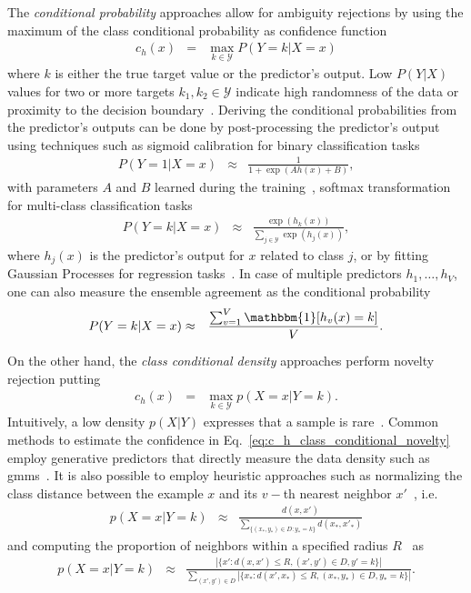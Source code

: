 The \emph{conditional probability} approaches allow for ambiguity rejections by using the maximum of the class conditional probability as confidence function~\citep{Pazzani1994,Fumera2004a,Lam1995}
\begin{eqnarray}\label{eq:c_h_class_conditional_ambiguity}
    c_h(x) &=& \max_{k\in \mathcal{Y}} P(Y=k|X=x)
\end{eqnarray}
where $k$ is either the true target value or the predictor's output. Low $P(Y|X)$ values for two or more targets $k_1, k_2 \in \mathcal{Y}$ indicate high randomness of the data or proximity to the decision boundary~\citep{Arlandis2002}. Deriving the conditional probabilities from the predictor's outputs can be done by post-processing the predictor's output using techniques such as sigmoid calibration for binary classification tasks~\citep{Cordella2014,Brinkrolf2017}
\begin{eqnarray*}
    P(Y = 1|X=x) &\approx& \frac{1}{1+\exp(A h(x) + B)},
\end{eqnarray*}
with parameters $A$ and $B$ learned during the training~\citep{Brinkrolf2018}, softmax transformation for multi-class classification tasks~\citep{Kwok1999}
\begin{eqnarray*}
    P(Y = k|X=x) &\approx& \frac{\exp{(h_k(x))}}{\sum_{j \in \mathcal{Y}} \exp{(h_j(x))}},
\end{eqnarray*}
where $h_j(x)$ is the predictor's output for $x$ related to class $j$, or by fitting Gaussian Processes for regression tasks~\citep{SambuSeo2000}. In case of multiple predictors $h_1, \dots, h_V$, one can also measure the ensemble agreement as the conditional probability~\citep{Glodek2012,Zhang2013}
\begin{eqnarray*}
    P(Y = k|X=x) &\approx& \frac{\sum_{v=1}^V \mathbbm{1} [h_v(x) = k]}{V}.
\end{eqnarray*}


On the other hand, the \emph{class conditional density} approaches perform novelty rejection putting~\citep{Dubuisson1993,Dubuisson1985}
\begin{eqnarray}\label{eq:c_h_class_conditional_novelty}
    c_h(x) &=& \max_{k \in \mathcal{Y}} p(X=x|Y=k).
\end{eqnarray}
Intuitively, a low density $p(X|Y)$ expresses that a sample is rare~\citep{Condessa2015b}. Common methods to estimate the confidence in Eq.~\ref{eq:c_h_class_conditional_novelty} employ generative predictors that directly measure the data density such as \glspl{gmm}~\citep{Vailaya2000}. It is also possible to employ heuristic approaches such as normalizing the class distance between the example $x$ and its $v-$th nearest neighbor $x'$~\citep{Conte2012,Villmann2015,Fischer2014a}, i.e.
\begin{eqnarray*}
    p(X=x|Y=k) &\approx& \frac{d(x,x')}{\sum_{\{(x_*, y_*) \in D \colon y_* = k\}} d(x_*,x'_*)}
\end{eqnarray*}
and computing the proportion of neighbors within a specified radius $R$~\citep{Berlemont2015} as 
\begin{eqnarray*}
    p(X=x|Y=k) &\approx& \frac{|\{x' \colon d(x, x') \le R, (x',y')\in D, y' = k\}|}{\sum_{(x',y') \in D} |\{x_* \colon d(x', x_*) \le R, (x_*,y_*)\in D, y_* = k\}|}.
\end{eqnarray*}


